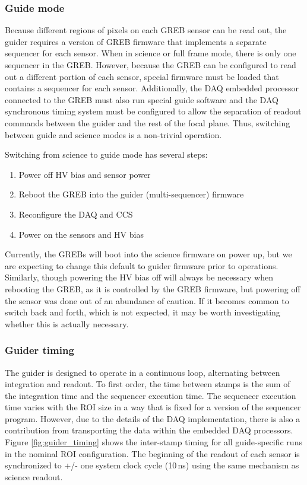 \subsubsection{Guide mode}
Because different regions of pixels on each GREB sensor can be read out, the guider requires a version of GREB firmware that implements a separate sequencer for each sensor. When in science or full frame mode, there is only one sequencer in the GREB. However, because the GREB can be configured to read out a different portion of each sensor, special firmware must be loaded that contains a sequencer for each sensor. Additionally, the DAQ embedded processor connected to the GREB must also run special guide software and the DAQ synchronous timing system must be configured to allow the separation of readout commands between the guider and the rest of the focal plane. Thus, switching between guide and science modes is a non-trivial operation. 

Switching from science to guide mode has several steps:
\begin{enumerate}
    \item Power off HV bias and sensor power
    \item Reboot the GREB into the guider (multi-sequencer) firmware
    \item Reconfigure the DAQ and CCS
    \item Power on the sensors and HV bias
\end{enumerate}

Currently, the GREBs will boot into the science firmware on power up, but we are expecting to change this default to guider firmware prior to operations. Similarly, though powering the HV bias off will always be necessary when rebooting the GREB, as it is controlled by the GREB firmware, but powering off the sensor was done out of an abundance of caution. If it becomes common to switch back and forth, which is not expected, it may be worth investigating whether this is actually necessary.

\subsubsection{Guider timing}
The guider is designed to operate in a continuous loop, alternating between integration and readout. To first order, the time between stamps is the sum of the integration time and the sequencer execution time. The sequencer execution time varies with the ROI size in a way that is fixed for a version of the sequencer program. However, due to the details of the DAQ implementation, there is also a contribution from transporting the data within the embedded DAQ processors. Figure \ref{fig:guider_timing} shows the inter-stamp timing for all guide-specific runs in the nominal ROI configuration. The beginning of the readout of each sensor is synchronized to +/- one system clock cycle (10\,ns) using the same mechanism as science readout. 

